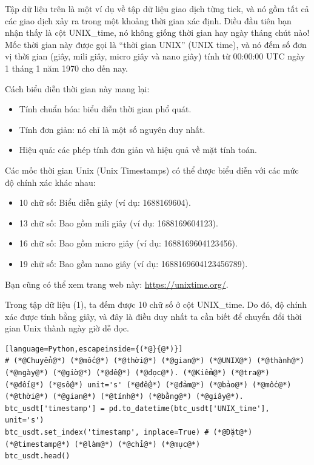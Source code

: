 Tập dữ liệu trên là một ví dụ về tập dữ liệu giao dịch từng tick, và nó gồm tất cả các giao dịch xảy ra trong một khoảng thời gian xác định. Điều đầu tiên bạn nhận thấy là cột UNIX\_time, nó không giống thời gian hay ngày tháng chút nào! Mốc thời gian này được gọi là ``thời gian UNIX'' (UNIX time), và nó đếm số đơn vị thời gian (giây, mili giây, micro giây và nano giây) tính từ 00:00:00 UTC ngày 1 tháng 1 năm 1970 cho đến nay.

Cách biểu diễn thời gian này mang lại:

\begin{itemize}
  \item Tính chuẩn hóa: biểu diễn thời gian phổ quát.
  \item Tính đơn giản: nó chỉ là một số nguyên duy nhất.
  \item Hiệu quả: các phép tính đơn giản và hiệu quả về mặt tính toán.
\end{itemize}

Các mốc thời gian Unix (Unix Timestamps) có thể được biểu diễn với các mức độ chính xác khác nhau:

\begin{itemize}
  \item 10 chữ số: Biểu diễn giây (ví dụ: 1688169604).
  \item 13 chữ số: Bao gồm mili giây (ví dụ: 1688169604123).
  \item 16 chữ số: Bao gồm micro giây (ví dụ: 1688169604123456).
  \item 19 chữ số: Bao gồm nano giây (ví dụ: 1688169604123456789).
\end{itemize}

Bạn cũng có thể xem trang web này: \url{https://unixtime.org/}.

Trong tập dữ liệu (1), ta đếm được 10 chữ số ở cột UNIX\_time. Do đó, độ chính xác được tính bằng giây, và đây là điều duy nhất ta cần biết để chuyển đổi thời gian Unix thành ngày giờ dễ đọc.

\begin{lstlisting}[language=Python,escapeinside={(*@}{@*)}]
# (*@Chuyển@*) (*@mốc@*) (*@thời@*) (*@gian@*) (*@UNIX@*) (*@thành@*) (*@ngày@*) (*@giờ@*) (*@dễ@*) (*@đọc@*). (*@Kiểm@*) (*@tra@*) (*@đối@*) (*@số@*) unit='s' (*@để@*) (*@đảm@*) (*@bảo@*) (*@mốc@*) (*@thời@*) (*@gian@*) (*@tính@*) (*@bằng@*) (*@giây@*).
btc_usdt['timestamp'] = pd.to_datetime(btc_usdt['UNIX_time'], unit='s')
btc_usdt.set_index('timestamp', inplace=True) # (*@Đặt@*) (*@timestamp@*) (*@làm@*) (*@chỉ@*) (*@mục@*)
btc_usdt.head()
\end{lstlisting}

